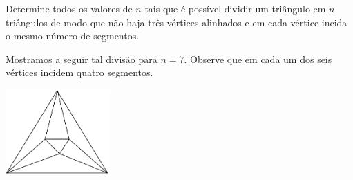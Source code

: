 Determine todos os valores de $n$ tais que é possível dividir um triângulo em $n$ triângulos de
modo que não haja três vértices alinhados e em cada vértice incida o mesmo número de
segmentos.

Mostramos a seguir tal divisão para $n = 7$. Observe que em cada um dos seis vértices incidem
quatro segmentos.

\begin{center}
\includegraphics[width = 4cm]{figura.png}
\end{center}